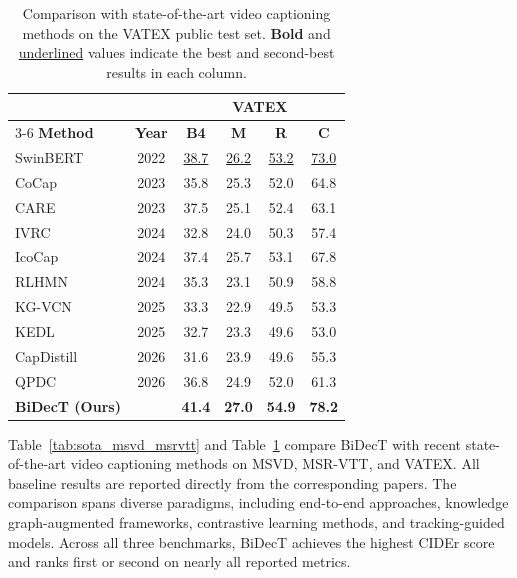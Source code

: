 \begin{table}[!t]
\caption{Comparison with state-of-the-art video captioning methods on the VATEX public test set. \textbf{Bold} and \underline{underlined} values indicate the best and second-best results in each column.}
\label{tab:sota_vatex}
\centering
\begin{tabular}{l c cccc}
\hline\hline
 & & \multicolumn{4}{c}{\textbf{VATEX}} \\
\cline{3-6}
\textbf{Method} & \textbf{Year} & \textbf{B4} & \textbf{M} & \textbf{R} & \textbf{C} \\
\hline
SwinBERT~\cite{linSwinBERTEndtoEndTransformers2022} & 2022 & \underline{38.7} & \underline{26.2} & \underline{53.2} & \underline{73.0} \\
CoCap~\cite{shenAccurateFastCompressed2023} & 2023 & 35.8 & 25.3 & 52.0 & 64.8 \\
CARE~\cite{yangConceptAwareVideoCaptioning2023} & 2023 & 37.5 & 25.1 & 52.4 & 63.1 \\
IVRC~\cite{tianRethinkVideoRetrieval2024} & 2024 & 32.8 & 24.0 & 50.3 & 57.4 \\
IcoCap~\cite{liangIcoCapImprovingVideo2024} & 2024 & 37.4 & 25.7 & 53.1 & 67.8 \\
RLHMN~\cite{liLearningHierarchicalModular2024} & 2024 & 35.3 & 23.1 & 50.9 & 58.8 \\
KG-VCN~\cite{yuanFullyExploringObject2025} & 2025 & 33.3 & 22.9 & 49.5 & 53.3 \\
KEDL~\cite{wangKnowledgeEnhancementDisentanglement2025} & 2025 & 32.7 & 23.3 & 49.6 & 53.0 \\
CapDistill~\cite{luoDualhierarchicalKnowledgeDistillation2026} & 2026 & 31.6 & 23.9 & 49.6 & 55.3 \\
QPDC~\cite{chenAskFocusMore2026} & 2026 & 36.8 & 24.9 & 52.0 & 61.3 \\
\hline
\textbf{BiDecT (Ours)} & & \textbf{41.4} & \textbf{27.0} & \textbf{54.9} & \textbf{78.2} \\
\hline\hline
\end{tabular}
\end{table}

Table~\ref{tab:sota_msvd_msrvtt} and Table~\ref{tab:sota_vatex} compare BiDecT with recent state-of-the-art video captioning methods on MSVD, MSR-VTT, and VATEX. All baseline results are reported directly from the corresponding papers. The comparison spans diverse paradigms, including end-to-end approaches, knowledge graph-augmented frameworks, contrastive learning methods, and tracking-guided models. Across all three benchmarks, BiDecT achieves the highest CIDEr score and ranks first or second on nearly all reported metrics.

